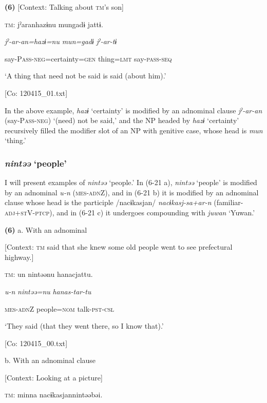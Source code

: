\textbf{(6)}  [Context: Talking about \textsc{tm}’s son]

  \textsc{tm}:  jˀaranhazɨnu  mungadɨ  jattɨ.

    \textit{jˀ-ar-an=hazɨ=nu}  \textit{mun=gadɨ}  \textit{jˀ-ar-tɨ}

    say-P\textsc{ass}-\textsc{neg}=certainty=\textsc{gen}  thing=\textsc{lmt}  say-\textsc{pass}-\textsc{seq}

    ‘A thing that need not be said is said (about him).’

    [Co: 120415\_01.txt]

In the above example, \textit{hazɨ} ‘certainty’ is modified by an adnominal clause \textit{jˀ-ar-an} (say-P\textsc{ass}-\textsc{neg}) ‘(need) not be said,’ and the NP headed by \textit{hazɨ} ‘certainty’ recursively filled the modifier slot of an NP with genitive case, whose head is \textit{mun} ‘thing.’

\subsubsection{\textit{nintəə} ‘people’}

I will present examples of \textit{nintəə} ‘people.’ In (6-21 a), \textit{nintəə} ‘people’ is modified by an adnominal \textit{u-n} (\textsc{mes}-\textsc{adn}Z), and in (6-21 b) it is modified by an adnominal clause whose head is the participle /nacɨkasjan/ \textit{nacɨkasj-sa+ar-n} (familiar-\textsc{adj}+\textsc{st}V-\textsc{ptcp}), and in (6-21 c) it undergoes compounding with \textit{juwan} ‘Yuwan.’

\textbf{(6)}  a.  With an adnominal

    [Context: \textsc{tm} said that she knew some old people went to see prefectural highway.]

    \textsc{tm}:  un  nintəənu  hanacjattu.

      \textit{u-n}  \textit{nintəə=nu}  \textit{hanas-tar-tu}

      \textsc{mes}-\textsc{adn}Z  people=\textsc{nom}  talk-\textsc{pst}-\textsc{csl}

      ‘They said (that they went there, so I know that).’

      [Co: 120415\_00.txt]

  b.  With an adnominal clause

    [Context: Looking at a picture]

    \textsc{tm}:  minna  nacɨkasjannintəəbəi.

